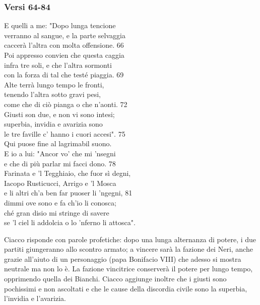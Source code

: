 \documentclass[10pt,a4paper]{article}
\begin{document}
	\subsubsection{Versi 64-84}
	
	\begin{estratto}
		E quelli a me: "Dopo lunga tencione\\
		verranno al sangue, e la parte selvaggia\\
		caccerà l’altra con molta offensione.		66\\
		
		Poi appresso convien che questa caggia\\
		infra tre soli, e che l’altra sormonti\\
		con la forza di tal che testé piaggia.		69\\
		
		Alte terrà lungo tempo le fronti,\\
		tenendo l’altra sotto gravi pesi,\\
		come che di ciò pianga o che n’aonti.		72\\
		
		Giusti son due, e non vi sono intesi;\\
		superbia, invidia e avarizia sono\\
		le tre faville c’ hanno i cuori accesi".		75\\
		
		Qui puose fine al lagrimabil suono.\\
		E io a lui: "Ancor vo’ che mi ’nsegni\\
		e che di più parlar mi facci dono.		78\\
		
		Farinata e ’l Tegghiaio, che fuor sì degni,\\
		Iacopo Rusticucci, Arrigo e ’l Mosca\\
		e li altri ch’a ben far puoser li ’ngegni,		81\\
		
		dimmi ove sono e fa ch’io li conosca;\\
		ché gran disio mi stringe di savere\\
		se ’l ciel li addolcia o lo ’nferno li attosca".\\
	\end{estratto}

	Ciacco risponde con parole profetiche: dopo una lunga alternanza di potere, i due partiti giungeranno allo scontro armato; a vincere sarà la fazione dei Neri, anche grazie all’aiuto di un personaggio (papa Bonifacio VIII) che adesso si mostra neutrale ma non lo è. La fazione vincitrice conserverà il potere per lungo tempo, opprimendo quella dei Bianchi. Ciacco aggiunge inoltre che i giusti sono pochissimi e non ascoltati e che le cause della discordia civile sono la superbia, l’invidia e l’avarizia. 
	
\end{document}
